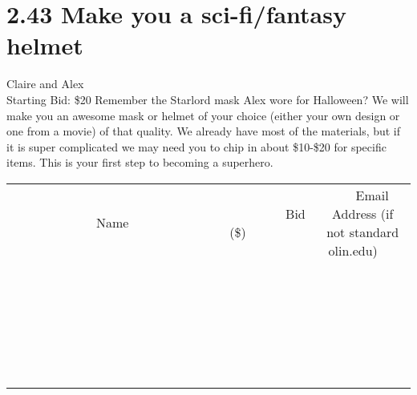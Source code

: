\documentclass[11pt]{article}
\begin{document}
\section*{2.43 Make you a sci-fi/fantasy helmet}
Claire and Alex
\\
Starting Bid: \$20
\newline
Remember the Starlord mask Alex wore for Halloween?
We will make you an awesome mask or helmet of your choice (either your own design or one from a movie) of that quality. 
We already have most of the materials, but if it is super complicated we may need you to chip in about \$10-\$20 for specific items.
This is your first step to becoming a superhero.
\\[6ex]
\begin{tabular}{c c c}
~~~~~~~~~~~~~Name~~~~~~~~~~~~~ & ~~~~~~~~~Bid (\$)~~~~~~~~~  & ~~~Email Address (if not standard olin.edu)~~~\\
 & & \\
\hline
 & & \\
\hline
 & & \\
\hline
 & & \\
\hline
 & & \\
\hline
 & & \\
\hline
 & & \\
\hline
 & & \\
\hline
 & & \\
\hline
 & & \\
\hline
 & & \\
\hline
 & & \\
\hline
 & & \\
\hline
 & & \\
\hline
 & & \\
\hline
 & & \\
\hline
 & & \\
\hline
 & & \\
\hline
 & & \\
\hline
 & & \\
\hline
 & & \\
\hline
 & & \\
\hline
 & & \\
\hline
 & & \\
\hline
 & & \\
\hline
 & & \\
\hline
\end{tabular}
\newpage
\end{document}
